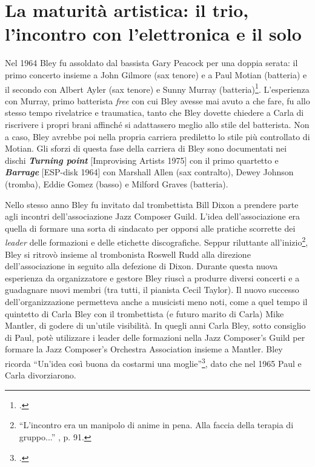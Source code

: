 \section{La maturità artistica: il trio, l'incontro con l'elettronica e il solo}
Nel 1964 Bley fu assoldato dal bassista Gary Peacock per una doppia serata: il primo concerto insieme a John Gilmore (sax tenore) e a Paul Motian (batteria) e il secondo con Albert Ayler (sax tenore) e Sunny Murray (batteria)\footcite[89]{stopping}. L'esperienza con Murray, primo batterista \textit{free} con cui Bley avesse mai avuto a che fare, fu allo stesso tempo rivelatrice e traumatica, tanto che Bley dovette chiedere a Carla di riscrivere i propri brani affinché si adattassero meglio allo stile del batterista. Non a caso, Bley avrebbe poi nella propria carriera prediletto lo stile più controllato di Motian. Gli sforzi di questa fase della carriera di Bley sono documentati nei dischi \textit{\textbf{Turning point}} [Improvising Artists 1975] con il primo quartetto e \textit{\textbf{Barrage}} [ESP-disk 1964] con Marshall Allen (sax contralto), Dewey Johnson (tromba), Eddie Gomez (basso) e Milford Graves (batteria).\par
Nello stesso anno Bley fu invitato dal trombettista Bill Dixon a prendere parte agli incontri dell'associazione Jazz Composer Guild. L'idea dell'associazione era quella di formare una sorta di sindacato per opporsi alle pratiche scorrette dei \textit{leader} delle formazioni e delle etichette discografiche. Seppur riluttante all'inizio\footnote{``L'incontro era un manipolo di anime in pena. Alla faccia della terapia di gruppo...'' \cite{stopping}, p. 91.}, Bley si ritrovò insieme al trombonista Roswell Rudd alla direzione dell'associazione in seguito alla defezione di Dixon. Durante questa nuova esperienza da organizzatore e gestore Bley riuscì a produrre diversi concerti e a guadagnare nuovi membri (tra tutti, il pianista Cecil Taylor). Il nuovo successo dell'organizzazione permetteva anche a musicisti meno noti, come a quel tempo il quintetto di Carla Bley con il trombettista (e futuro marito di Carla) Mike Mantler, di godere di un'utile visibilità. In quegli anni Carla Bley, sotto consiglio di Paul, potè utilizzare i leader delle formazioni nella Jazz Composer's Guild per formare la Jazz Composer's Orchestra Association insieme a Mantler. Bley ricorda ``Un'idea così buona da costarmi una moglie''\footcite[95]{stopping}, dato che nel 1965 Paul e Carla divorziarono.\par
